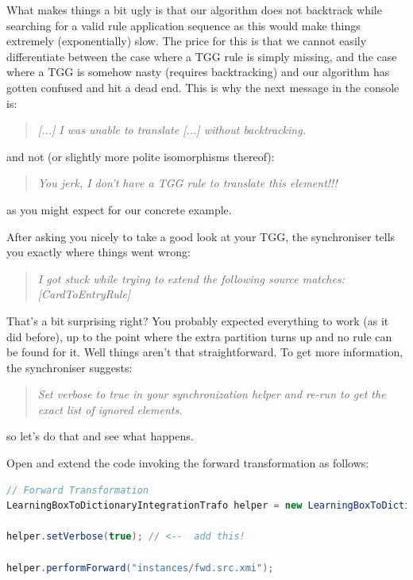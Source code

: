 What makes things a bit ugly is that our algorithm does not backtrack while searching for a valid rule application sequence as this would make things extremely (exponentially) slow.
The price for this is that we cannot easily differentiate between the case where a TGG rule is simply missing, and the case where a TGG is somehow nasty (requires backtracking) and our algorithm has gotten confused and hit a dead end.
This is why the next message in the console is:
\begin{quote}
\emph{[...] I was unable to translate [...] without backtracking.}
\end{quote}
and not (or slightly more polite isomorphisms thereof):
\begin{quote}
  \emph{You jerk, I don't have a TGG rule to translate this element!!!}
\end{quote}
as you might expect for our concrete example.

After asking you nicely to take a good look at your TGG, the synchroniser tells you exactly where things went wrong:
\begin{quote}
  \emph{I got stuck while trying to extend the following source matches: [CardToEntryRule]}
\end{quote}
That's a bit surprising right?  You probably expected everything to work (as it did before), up to the point where the extra partition turns up and no rule can be found for it.
Well things aren't that straightforward.
To get more information, the synchroniser suggests:
\begin{quote}
  \emph{Set verbose to true in your synchronization helper and re-run to get the exact list of ignored elements.}
\end{quote}
so let's do that and see what happens.

\begin{stepbystep}
\item Open  and extend the code invoking the forward transformation as follows:
\begin{lstlisting}[language=Java]
// Forward Transformation
LearningBoxToDictionaryIntegrationTrafo helper = new LearningBoxToDictionaryIntegrationTrafo();

helper.setVerbose(true); // <--  add this!

helper.performForward("instances/fwd.src.xmi");
\end{lstlisting}
\end{stepbystep}

